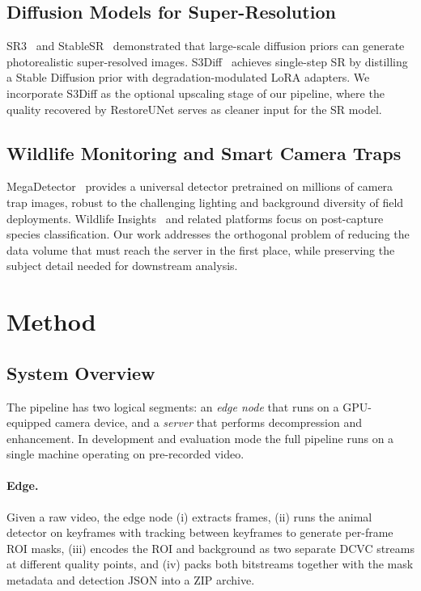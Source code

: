 \documentclass[10pt, conference]{IEEEtran}
\begin{document}
\subsection{Diffusion Models for Super-Resolution}

SR3~\cite{Saharia_2022_SR3} and StableSR~\cite{Wang_2023_StableSR} demonstrated that large-scale diffusion priors can generate photorealistic super-resolved images. S3Diff~\cite{Zhang_2024_S3Diff} achieves single-step SR by distilling a Stable Diffusion prior with degradation-modulated LoRA adapters. We incorporate S3Diff as the optional upscaling stage of our pipeline, where the quality recovered by RestoreUNet serves as cleaner input for the SR model.

\subsection{Wildlife Monitoring and Smart Camera Traps}

MegaDetector~\cite{Beery_2019_MegaDetector} provides a universal detector pretrained on millions of camera trap images, robust to the challenging lighting and background diversity of field deployments. Wildlife Insights~\cite{Ahumada_2020_WildlifeInsights} and related platforms focus on post-capture species classification. Our work addresses the orthogonal problem of reducing the data volume that must reach the server in the first place, while preserving the subject detail needed for downstream analysis.


\section{Method}
\label{sec:method}

\subsection{System Overview}
\label{ssec:overview}

The pipeline has two logical segments: an \emph{edge node} that runs on a GPU-equipped camera device, and a \emph{server} that performs decompression and enhancement. In development and evaluation mode the full pipeline runs on a single machine operating on pre-recorded video.

\paragraph{Edge.} Given a raw video, the edge node (i) extracts frames, (ii) runs the animal detector on keyframes with tracking between keyframes to generate per-frame ROI masks, (iii) encodes the ROI and background as two separate DCVC streams at different quality points, and (iv) packs both bitstreams together with the mask metadata and detection JSON into a ZIP archive.
\end{document}
